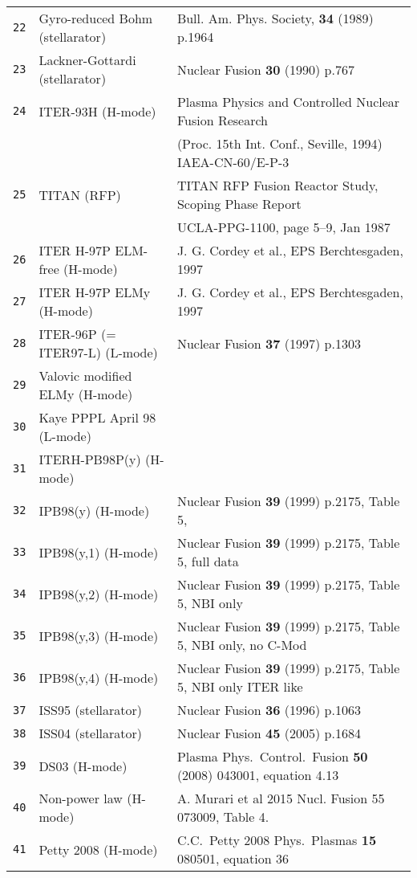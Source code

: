 \documentclass[11pt,a4paper]{report}
\begin{document}
\begin{table}[tbph]
\begin{center}
\begin{tabular}{||c||l|l||}
\texttt{22} & Gyro-reduced Bohm (stellarator) & Bull. Am. Phys. Society, \textbf{34}
(1989) p.1964 \\
\texttt{23} & Lackner-Gottardi (stellarator) & Nuclear Fusion \textbf{30} (1990) p.767 \\
\texttt{24} & ITER-93H (H-mode) & Plasma Physics and Controlled Nuclear Fusion Research \\
 & & (Proc. 15th Int. Conf., Seville, 1994) IAEA-CN-60/E-P-3 \\
\texttt{25} & TITAN (RFP) & TITAN RFP Fusion Reactor Study, Scoping Phase Report \\
 & & UCLA-PPG-1100, page 5--9, Jan 1987 \\
\texttt{26} & ITER H-97P ELM-free (H-mode) & J. G. Cordey et al., EPS Berchtesgaden, 1997 \\
\texttt{27} & ITER H-97P ELMy (H-mode) & J. G. Cordey et al., EPS Berchtesgaden, 1997 \\
\texttt{28} & ITER-96P (= ITER97-L) (L-mode) & Nuclear Fusion \textbf{37} (1997) p.1303 \\
\texttt{29} & Valovic modified ELMy (H-mode) &  \\
\texttt{30} & Kaye PPPL April 98 (L-mode) &  \\
\texttt{31} & ITERH-PB98P(y) (H-mode) &  \\
\texttt{32} & IPB98(y) (H-mode)   & Nuclear Fusion \textbf{39} (1999) p.2175, Table 5, \\
\texttt{33} & IPB98(y,1) (H-mode) & Nuclear Fusion \textbf{39} (1999) p.2175, Table 5, full data\\
\texttt{34} & IPB98(y,2) (H-mode) & Nuclear Fusion \textbf{39} (1999) p.2175, Table 5, NBI only\\
\texttt{35} & IPB98(y,3) (H-mode) & Nuclear Fusion \textbf{39} (1999) p.2175, Table 5, NBI only, no C-Mod\\
\texttt{36} & IPB98(y,4) (H-mode) & Nuclear Fusion \textbf{39} (1999) p.2175, Table 5, NBI only ITER like\\
\texttt{37} & ISS95 (stellarator) & Nuclear Fusion \textbf{36} (1996) p.1063 \\
\texttt{38} & ISS04 (stellarator) & Nuclear Fusion \textbf{45} (2005) p.1684 \\
\texttt{39} & DS03 (H-mode) & Plasma Phys.\ Control.\ Fusion \textbf{50} (2008) 043001, equation 4.13 \\
\texttt{40} & Non-power law (H-mode) & A. Murari et al 2015 Nucl. Fusion 55 073009, Table 4. \\
\texttt{41} & Petty 2008 (H-mode)&  C.C.~Petty 2008 Phys.\ Plasmas \textbf{15} 080501, equation 36\\

\end{tabular}
\end{center}
\end{table}
\end{document}
